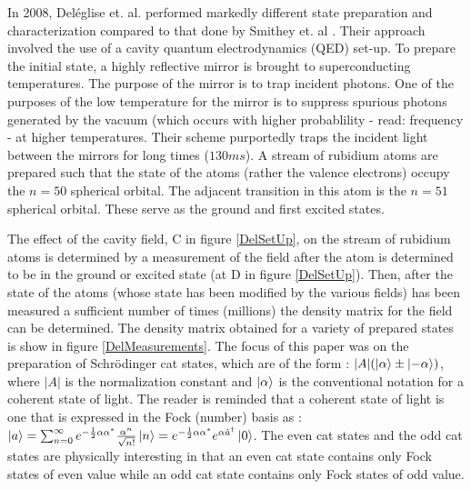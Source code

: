 In 2008, Del\'{e}glise et. al. \cite{Deleglise} performed markedly different state preparation and characterization compared to that done by Smithey et. al \cite{Smithey}. Their approach involved the use of a cavity quantum electrodynamics (QED) set-up. To prepare the initial state, a highly reflective mirror is brought to superconducting temperatures. The purpose of the mirror is to trap incident photons. One of the purposes of the low temperature for the mirror is to suppress spurious photons generated by the vacuum (which occurs with higher probablility - read: frequency - at higher temperatures. Their scheme purportedly traps the incident light between the mirrors for long times ($130 ms$). A stream of rubidium atoms are prepared such that the state of the atoms (rather the valence electrons) occupy the $n=50$ spherical orbital. The adjacent transition in this atom is the $n=51$ spherical orbital. These serve as the ground and first excited states.

The effect of the cavity field, C in figure \ref{DelSetUp}, on the stream of rubidium atoms is determined by a measurement of the field after the atom is determined to be in the ground or excited state (at D in figure \ref{DelSetUp}). Then, after the state of the atoms (whose state has been modified by the various fields) has been measured a sufficient number of times (millions) the density matrix for the field can be determined. The density matrix obtained for a variety of prepared states is show in figure \ref{DelMeasurements}. The focus of this paper was on the preparation of Schr\"odinger cat states, which are of the form : $|A|(\ket{\alpha}\pm\ket{-\alpha})$, where $|A|$ is the normalization constant and $\ket{\alpha}$ is the conventional notation for a coherent state of light. The reader is reminded that a coherent state of light is one that is expressed in the Fock (number) basis as : $\ket{a} = \sum_{n=0}^{\infty} e^{-\frac{1}{2}\alpha\alpha^*}\frac{\alpha^n}{\sqrt{n!}}\ket{n}=e^{-\frac{1}{2}\alpha\alpha^*}e^{\alpha\hat{a}^\dagger}\ket{0}$. The even cat states and the odd cat states are physically interesting in that an even cat state contains only Fock states of even value while an odd cat state contains only Fock states of odd value.

